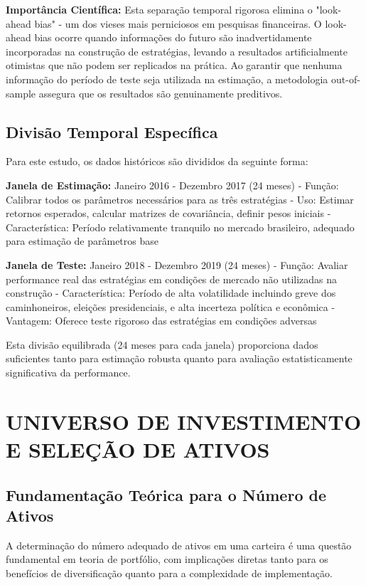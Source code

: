 \textbf{Importância Científica:} Esta separação temporal rigorosa elimina o "look-ahead bias" - um dos vieses mais perniciosos em pesquisas financeiras. O look-ahead bias ocorre quando informações do futuro são inadvertidamente incorporadas na construção de estratégias, levando a resultados artificialmente otimistas que não podem ser replicados na prática. Ao garantir que nenhuma informação do período de teste seja utilizada na estimação, a metodologia out-of-sample assegura que os resultados são genuinamente preditivos.

\subsection{Divisão Temporal Específica}

Para este estudo, os dados históricos são divididos da seguinte forma:

\textbf{Janela de Estimação:} Janeiro 2016 - Dezembro 2017 (24 meses)
- Função: Calibrar todos os parâmetros necessários para as três estratégias
- Uso: Estimar retornos esperados, calcular matrizes de covariância, definir pesos iniciais
- Característica: Período relativamente tranquilo no mercado brasileiro, adequado para estimação de parâmetros base

\textbf{Janela de Teste:} Janeiro 2018 - Dezembro 2019 (24 meses)
- Função: Avaliar performance real das estratégias em condições de mercado não utilizadas na construção
- Característica: Período de alta volatilidade incluindo greve dos caminhoneiros, eleições presidenciais, e alta incerteza política e econômica
- Vantagem: Oferece teste rigoroso das estratégias em condições adversas

Esta divisão equilibrada (24 meses para cada janela) proporciona dados suficientes tanto para estimação robusta quanto para avaliação estatisticamente significativa da performance.

\section{UNIVERSO DE INVESTIMENTO E SELEÇÃO DE ATIVOS}

\subsection{Fundamentação Teórica para o Número de Ativos}

A determinação do número adequado de ativos em uma carteira é uma questão fundamental em teoria de portfólio, com implicações diretas tanto para os benefícios de diversificação quanto para a complexidade de implementação.

